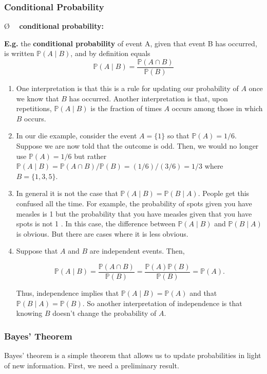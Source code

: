 \documentclass[13pt]{article}
\theoremstyle{definition}
\theoremstyle{remark}
\newenvironment{remark}
  {\pushQED{\qed}\renewcommand{\qedsymbol}{$\triangle$}\remarkx}
  {\popQED\endremarkx}
\newenvironment{point}
  {\O~~}
  {}
\newcommand{\PP}{\mathbb{P}}
\begin{document}
\subsubsection{Conditional Probability}
\begin{point}
    \textbf{conditional probability:} 
    
    \textbf{E.g.} the \textbf{conditional probability} of event A, given that event B has occurred, is written $\PP(A\mid B)$, and by definition equals
$$\PP(A\mid B)=\frac{\PP(A\cap B)}{\PP(B)}$$
\end{point}

\begin{remark}\hfill
\begin{enumerate}[label=(\arabic*)]
    \item One interpretation is that this is a rule for updating our probability of $A$ once we know that $B$ has occurred. Another interpretation is that, upon repetitions, $\PP(A \mid B)$ is the fraction of times $A$ occurs among those in which $B$ occurs.
    \item In our die example, consider the event $A=\{1\}$ so that $\PP(A)=1 / 6$. Suppose we are now told that the outcome is odd. Then, we would no longer use $\PP(A)=1 / 6$ but rather $\PP(A \mid B)=\PP(A \cap B) / \PP(B)=(1 / 6) /(3 / 6)=1 / 3$ where $B=\{1,3,5\}$.
    \item In general it is not the case that $\PP(A \mid B)=\PP(B \mid A)$. People get this confused all the time. For example, the probability of spots given you have measles is 1 but the probability that you have measles given that you have spots is not 1 . In this case, the difference between $\PP(A \mid B)$ and $\PP(B \mid A)$ is obvious. But there are cases where it is less obvious.
    \item Suppose that $A$ and $B$ are independent events. Then,

$$
\PP(A \mid B)=\frac{\PP(A\cap  B)}{\PP(B)}=\frac{\PP(A) \PP(B)}{\PP(B)}=\PP(A) .
$$

Thus, independence implies that $\PP(A \mid B)=\PP(A)$ and that $\PP(B \mid A)=\PP(B)$. So another interpretation of independence is that knowing $B$ doesn't change the probability of $A$.
\end{enumerate}
\end{remark}

\subsubsection{Bayes' Theorem}
Bayes' theorem is a simple theorem that allows us to update probabilities in light of new information. First, we need a preliminary result.
\end{document}
